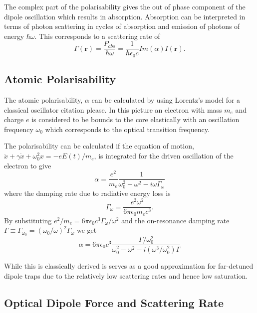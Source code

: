 The complex part of the polarisability gives the out of phase component of the dipole oscillation which results in absorption. Absorption can be interpreted in terms of photon scattering in cycles of absorption and emission of photons of energy $\hbar \omega$. This corresponds to a scattering rate of
\begin{equation}\label{eq:scattering_rate}
\Gamma(\boldsymbol r) = \frac{P_{abs}}{\hbar \omega} = \frac{1}{\hbar \epsilon_0 c} Im(\alpha) I(\boldsymbol r).
\end{equation}

\subsection{Atomic Polarisability}

The atomic polarisability, $\alpha$ can be calculated by using Lorentz's model for a classical oscillator {\color{red} citation please}. In this picture an electron with mass $m_e$ and charge $e$ is considered to be bounds to the core elastically with an oscillation frequency $\omega_0$ which corresponds to the optical transition frequency.

The polarisability can be calculated if the equation of motion, $\ddot{x} + \gamma \dot{x} + \omega_0^2 x = -eE(t)/m_e$, is integrated for the driven oscillation of the electron to give
\begin{equation} \label{eq:polarisability}
\alpha = \frac{e^2}{m_e} \frac{1}{\omega_0^2-\omega^2-i\omega\Gamma_\omega}
\end{equation}
where the damping rate due to radiative energy loss is
\begin{equation}\label{eq:damping_rate}
\Gamma_\omega=\frac{e^2\omega^2}{6\pi\epsilon_0m_ec^3}.
\end{equation}
By substituting $e^2/m_e=6\pi\epsilon_0 c^3\Gamma_\omega / \omega^2$ and the on-resonance damping rate $\Gamma \equiv \Gamma_{\omega_0} = (\omega_0/\omega)^2\Gamma_\omega$ we get
\begin{equation}\label{eq:final_polarisability}
\alpha = 6\pi \epsilon_0 c^3 \frac{\Gamma/\omega_0^2}{\omega_0^2 - \omega^2 - i(\omega^3/\omega_0^2)\Gamma}
\end{equation}

While this is classically derived is serves as a good approximation for far-detuned dipole traps due to the relatively low scattering rates and hence low saturation\cite{grimm_optical_2000}.

\subsection{Optical Dipole Force and Scattering Rate}

